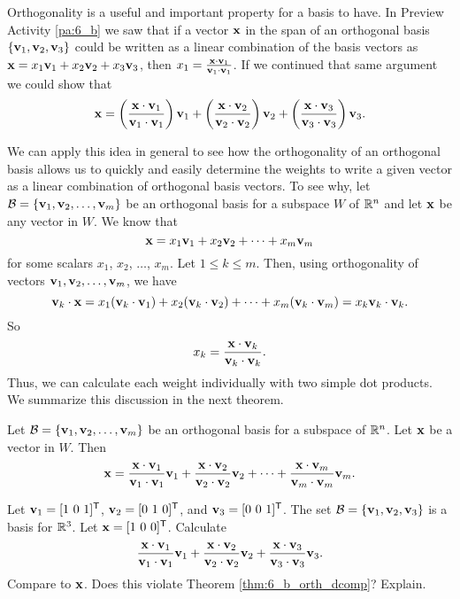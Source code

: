 
Orthogonality is a useful and important property for a basis to have. In Preview Activity \ref{pa:6_b} we saw that if a vector $\mathbf{x}$ in the span of an orthogonal basis $\{\mathbf{v}_1, \mathbf{v}_2, \mathbf{v}_3\}$ could be written as a linear combination of the basis vectors as $\mathbf{x} = x_1 \mathbf{v}_1 + x_2 \mathbf{v}_2 + x_3 \mathbf{v}_3$, then $x_1 = \frac{\mathbf{x} \cdot \mathbf{v}_1}{\mathbf{v}_1 \cdot \mathbf{v}_1}$. If we continued that same argument we could show that 
\[\mathbf{x} = \left(\frac{\mathbf{x} \cdot \mathbf{v}_1}{\mathbf{v}_1 \cdot \mathbf{v}_1}\right) \mathbf{v}_1 + \left(\frac{\mathbf{x} \cdot \mathbf{v}_2}{\mathbf{v}_2 \cdot \mathbf{v}_2}\right) \mathbf{v}_2 + \left(\frac{\mathbf{x} \cdot \mathbf{v}_3}{\mathbf{v}_3 \cdot \mathbf{v}_3}\right) \mathbf{v}_3.\]

We can apply this idea in general to see how the orthogonality of an orthogonal basis allows us to quickly and easily determine the weights to write a given vector as a linear combination of orthogonal basis vectors. To see why, let $\mathcal{B} = \{\mathbf{v}_1, \mathbf{v}_2, \ldots, \mathbf{v}_m\}$ be an orthogonal basis for a subspace $W$ of $\mathbb{R}^n$ and let $\mathbf{x}$ be any vector in $W$. We know that
\[\mathbf{x} = x_1\mathbf{v}_1 + x_2\mathbf{v}_2 + \cdots + x_m \mathbf{v}_m\]
for some scalars $x_1$, $x_2$, $\ldots$, $x_m$. Let $1\leq k\leq m$. Then, using orthogonality of vectors $\mathbf{v}_1, \mathbf{v}_2, \ldots, \mathbf{v}_m$, we have
\[\mathbf{v}_k \cdot \mathbf{x} = x_1(\mathbf{v}_k \cdot \mathbf{v}_1) + x_2(\mathbf{v}_k \cdot \mathbf{v}_2) + \cdots + x_m(\mathbf{v}_k \cdot \mathbf{v}_m) = x_k \mathbf{v}_k \cdot \mathbf{v}_k.\]
So
\[x_k = \displaystyle \frac{\mathbf{x} \cdot \mathbf{v}_k}{\mathbf{v}_k \cdot \mathbf{v}_k}.\]
Thus, we can calculate each weight individually with two simple dot products. We summarize this discussion in the next theorem.

\begin{theorem} \label{thm:6_b_orth_dcomp} Let $\mathcal{B} = \{\mathbf{v}_1, \mathbf{v}_2, \ldots, \mathbf{v}_m\}$ be an orthogonal basis for a subspace of $\mathbb{R}^n$. Let $\mathbf{x}$ be a vector in $W$. Then
\begin{equation}
\mathbf{x} = \displaystyle \frac{\mathbf{x} \cdot \mathbf{v}_1}{\mathbf{v}_1 \cdot \mathbf{v}_1} \mathbf{v}_1 +  \frac{\mathbf{x} \cdot \mathbf{v}_2}{\mathbf{v}_2 \cdot \mathbf{v}_2} \mathbf{v}_2 + \cdots + \frac{\mathbf{x} \cdot \mathbf{v}_m}{\mathbf{v}_m \cdot \mathbf{v}_m} \mathbf{v}_m. \label{eq:6_b_orth_ddecomp}
\end{equation}
\end{theorem}


\begin{activity} Let $\mathbf{v}_1 = [1 \ 0 \ 1]^{\mathsf{T}}$, $\mathbf{v}_2 = [0 \ 1 \ 0]^{\mathsf{T}}$, and $\mathbf{v}_3 = [0 \ 0 \ 1]^{\mathsf{T}}$. The set $\mathcal{B} = \{\mathbf{v}_1, \mathbf{v}_2, \mathbf{v}_3\}$ is a basis for $\mathbb{R}^3$. Let $\mathbf{x} = [1 \ 0 \ 0]^{\mathsf{T}}$. Calculate 
\[\frac{\mathbf{x} \cdot \mathbf{v}_1}{\mathbf{v}_1 \cdot \mathbf{v}_1}\mathbf{v}_1 + \frac{\mathbf{x} \cdot \mathbf{v}_2}{\mathbf{v}_2 \cdot \mathbf{v}_2}\mathbf{v}_2 + \frac{\mathbf{x} \cdot \mathbf{v}_3}{\mathbf{v}_3 \cdot \mathbf{v}_3}\mathbf{v}_3.\]
Compare to $\mathbf{x}$. Does this violate Theorem \ref{thm:6_b_orth_dcomp}? Explain.

\end{activity}

